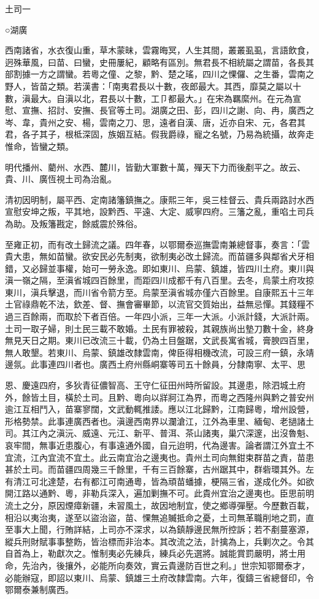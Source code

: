 
\begin{pinyinscope}
土司一

○湖廣

西南諸省，水衣復山重，草木蒙昧，雲霧晦冥，人生其間，叢叢虱虱，言語飲食，迥殊華風，曰苗、曰蠻，史冊屢紀，顧略有區別。無君長不相統屬之謂苗，各長其部割據一方之謂蠻。若粵之僮、之黎，黔、楚之瑤，四川之惈儸、之生番，雲南之野人，皆苗之類。若漢書：「南夷君長以十數，夜郎最大。其西，靡莫之屬以十數，滇最大。自滇以北，君長以十數，工⼙都最大。」在宋為羈縻州。在元為宣慰、宣撫、招討、安撫、長官等土司。湖廣之田、彭，四川之謝、向、冉，廣西之岑、韋，貴州之安、楊，雲南之刀、思，遠者自漢、唐，近亦自宋、元，各君其君，各子其子，根柢深固，族姻互結。假我爵祿，寵之名號，乃易為統攝，故奔走惟命，皆蠻之類。

明代播州、藺州、水西、麓川，皆勤大軍數十萬，殫天下力而後剷平之。故云、貴、川、廣恆視土司為治亂。

清初因明制，屬平西、定南諸籓鎮撫之。康熙三年，吳三桂督云、貴兵兩路討水西宣慰安坤之叛，平其地，設黔西、平遠、大定、威寧四府。三籓之亂，重啗土司兵為助。及叛籓戡定，餘威震於殊俗。

至雍正初，而有改土歸流之議。四年春，以鄂爾泰巡撫雲南兼總督事，奏言：「雲貴大患，無如苗蠻。欲安民必先制夷，欲制夷必改土歸流。而苗疆多與鄰省犬牙相錯，又必歸並事權，始可一勞永逸。即如東川、烏蒙、鎮雄，皆四川土府。東川與滇一嶺之隔，至滇省城四百餘里，而距四川成都千有八百里。去冬，烏蒙土府攻掠東川，滇兵擊退，而川省令箭方至。烏蒙至滇省城亦僅六百餘里。自康熙五十三年土官祿鼎乾不法，欽差、督、撫會審畢節，以流官交質始出，益無忌憚。其錢糧不過三百餘兩，而取於下者百倍。一年四小派，三年一大派。小派計錢，大派計兩。土司一取子婦，則土民三載不敢婚。土民有罪被殺，其親族尚出墊刀數十金，終身無見天日之期。東川已改流三十載，仍為土目盤踞，文武長寓省城，膏腴四百里，無人敢墾。若東川、烏蒙、鎮雄改隸雲南，俾臣得相機改流，可設三府一鎮，永靖邊氛。此事連四川者也。廣西土府州縣峒寨等司五十餘員，分隸南寧、太平、思

恩、慶遠四府，多狄青征儂智高、王守仁征田州時所留設。其邊患，除泗城土府外，餘皆土目，橫於土司。且黔、粵向以牂牁江為界，而粵之西隆州與黔之普安州逾江互相鬥入，苗寨寥闊，文武動輒推諉。應以江北歸黔，江南歸粵，增州設營，形格勢禁。此事連廣西者也。滇邊西南界以瀾滄江，江外為車里、緬甸、老撾諸土司。其江內之滇沅、威遠、元江、新平、普洱、茶山諸夷，巢穴深邃，出沒魯魁、哀牢間，無事近患腹心，有事遠通外國，自元迨明，代為邊害。論者謂江外宜土不宜流，江內宜流不宜土。此云南宜治之邊夷也。貴州土司向無鉗束群苗之責，苗患甚於土司。而苗疆四周幾三千餘里，千有三百餘寨，古州踞其中，群砦環其外。左有清江可北達楚，右有都江可南通粵，皆為頑苗蟠據，梗隔三省，遂成化外。如欲開江路以通黔、粵，非勒兵深入，遍加剿撫不可。此貴州宜治之邊夷也。臣思前明流土之分，原因煙瘴新疆，未習風土，故因地制宜，使之鄉導彈壓。今歷數百載，相沿以夷治夷，遂至以盜治盜，苗、惈無追贓抵命之憂，土司無革職削地之罰，直至事大上聞，行賄詳結，上司亦不深求，以為鎮靜邊民無所控訴；若不剷蔓塞源，縱兵刑財賦事事整飭，皆治標而非治本。其改流之法，計擒為上，兵剿次之。令其自首為上，勒獻次之。惟制夷必先練兵，練兵必先選將。誠能賞罰嚴明，將士用命，先治內，後攘外，必能所向奏效，實云貴邊防百世之利。」世宗知鄂爾泰才，必能辦寇，即詔以東川、烏蒙、鎮雄三土府改隸雲南。六年，復鑄三省總督印，令鄂爾泰兼制廣西。


\end{pinyinscope}
